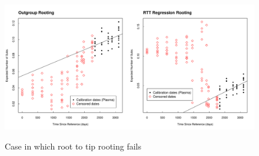 \begin{figure}[!ht] \label{fig:degenerate_example}
	\centering
	\includegraphics[scale=0.425]{figures/rtt.pdf} \\
	\caption[Example of bad root]{ Case in which root to tip rooting fails}
\end{figure}

